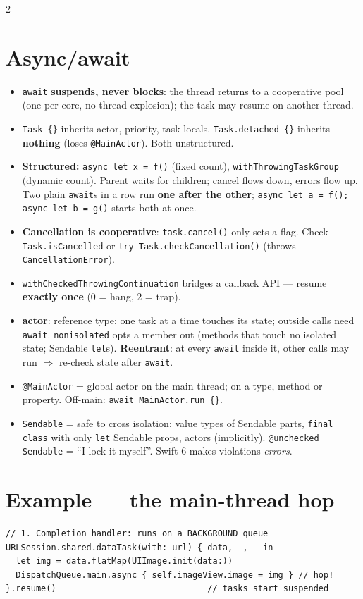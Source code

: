 \documentclass[8pt]{extarticle}
\begin{document}
\begin{multicols}{2}
\section{Async/await}
\begin{itemize}
  \item \texttt{await} \textbf{suspends, never blocks}: the thread returns to a
        cooperative pool (one per core, no thread explosion); the task may resume on
        another thread.
  \item \texttt{Task \{\}} inherits actor, priority, task-locals.
        \texttt{Task.detached \{\}} inherits \textbf{nothing} (loses
        \texttt{@MainActor}). Both unstructured.
  \item \textbf{Structured:} \texttt{async let x = f()} (fixed count),
        \texttt{withThrowingTaskGroup} (dynamic count). Parent waits for
        children; cancel flows down, errors flow up. Two plain
        \texttt{await}s in a row run \textbf{one after the other};
        \texttt{async let a = f(); async let b = g()} starts both at once.
  \item \textbf{Cancellation is cooperative}: \texttt{task.cancel()} only sets
        a flag. Check \texttt{Task.isCancelled} or \texttt{try
        Task.checkCancellation()} (throws \texttt{CancellationError}).
  \item \texttt{withCheckedThrowingContinuation} bridges a callback API — resume
        \textbf{exactly once} (0 = hang, 2 = trap).
  \item \textbf{actor}: reference type; one task at a time touches its state;
        outside calls need \texttt{await}. \texttt{nonisolated} opts a member out
        (methods that touch no isolated state; Sendable \texttt{let}s). \textbf{Reentrant}: at every \texttt{await} inside
        it, other calls may run $\Rightarrow$ re-check state after
        \texttt{await}.
  \item \texttt{@MainActor} = global actor on the main thread; on a type,
        method or property. Off-main: \texttt{await MainActor.run \{\}}.
  \item \texttt{Sendable} = safe to cross isolation: value types of Sendable
        parts, \texttt{final class} with only \texttt{let} Sendable props,
        actors (implicitly). \texttt{@unchecked Sendable} = ``I lock it myself''.
        Swift 6 makes violations \emph{errors}.
\end{itemize}

\section{Example — the main-thread hop}
\begin{lstlisting}[language=SwiftSheet]
// 1. Completion handler: runs on a BACKGROUND queue
URLSession.shared.dataTask(with: url) { data, _, _ in
  let img = data.flatMap(UIImage.init(data:))
  DispatchQueue.main.async { self.imageView.image = img } // hop!
}.resume()                              // tasks start suspended


\end{lstlisting}
\end{multicols}
\end{document}

